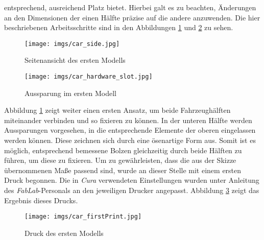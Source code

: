 \documentclass[.../Dokumentation.tex]{subfiles}
\begin{document}
entsprechend, ausreichend Platz bietet.
Hierbei galt es zu beachten, Änderungen an den Dimensionen der einen 
Hälfte präzise auf die andere anzuwenden. Die hier beschriebenen Arbeitsschritte sind in den Abbildungen 
\ref{fig-car-side} und \ref{fig-car-slot} zu sehen.
\begin{figure}[H]
\begin{center}
    \texttt{[image: imgs/car\_side.jpg]}
    \caption{Seitenansicht des ersten Modells}
    \label{fig-car-side}
\end{center}
\end{figure}
\begin{figure}[H]
\begin{center}
    \texttt{[image: imgs/car\_hardware\_slot.jpg]}
    \caption{Aussparung im ersten Modell}
    \label{fig-car-slot}
\end{center}
\end{figure}
\noindent
Abbildung \ref{fig-car-side} zeigt weiter einen ersten Ansatz, um beide 
Fahrzeughälften miteinander verbinden und so fixieren zu können. 
In der unteren Hälfte werden Aussparungen vorgesehen, in die entsprechende 
Elemente der oberen eingelassen werden können. Diese zeichnen sich durch eine 
ösenartige Form aus. Somit ist es möglich, entsprechend bemessene Bolzen 
gleichzeitig durch beide Hälften zu führen, um diese zu fixieren. Um zu gewährleisten, dass die aus der Skizze übernommenen Maße 
passend sind, wurde an dieser Stelle mit einem ersten Druck begonnen.
Die in \textit{Cura} verwendeten Einstellungen wurden unter Anleitung 
des \textit{FabLab}-Personals an den jeweiligen Drucker angepasst. 
Abbildung \ref{fig-car-firstPrint} zeigt das Ergebnis dieses Drucks.
\begin{figure}[H]
    \begin{center}
        \texttt{[image: imgs/car\_firstPrint.jpg]}
        \caption{Druck des ersten Modells}
        \label{fig-car-firstPrint}
    \end{center}
    \end{figure}
\end{document}
